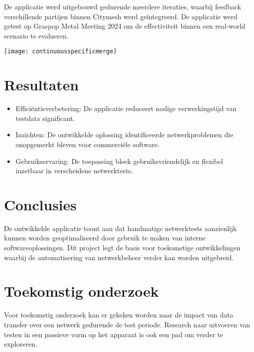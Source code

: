 \documentclass[a0,portrait]{hogent-poster}
\begin{document}
\begin{multicols}{2}
De applicatie werd uitgebouwd gedurende meerdere iteraties, waarbij feedback verschillende partijen binnen Citymesh werd geïntegreerd. De applicatie werd getest op Graspop Metal Meeting 2024 om de effectiviteit binnen een real-world scenario te evalueren.



\begin{center}
  \captionsetup{type=figure}
  \texttt{[image: continuousspecificmerge]}
\end{center}


\section{Resultaten}

\begin{itemize}
    \item Efficiëntieverbetering: De applicatie reduceert nodige verwerkingstijd van testdata significant.
    \item Inzichten: De ontwikkelde oplossing identificeerde netwerkproblemen die onopgemerkt bleven voor commerciële software.
    \item Gebruikservaring: De toepassing bleek gebruiksvriendelijk en flexibel inzetbaar in verscheidene netwerktests.
\end{itemize}

\section{Conclusies}

De ontwikkelde applicatie toont aan dat handmatige netwerktests aanzienlijk kunnen worden geoptimaliseerd door gebruik te maken van interne softwareoplossingen. Dit project legt de basis voor toekomstige ontwikkelingen waarbij de automatisering van netwerkbeheer verder kan worden uitgebreid.

\section{Toekomstig onderzoek}

Voor toekomstig onderzoek kan er gekeken worden naar de impact van data transfer over een netwerk gedurende de test periode. Research naar uitvoeren van testen in een passieve vorm op het apparaat is ook een pad om verder te exploreren.

\end{multicols}
\end{document}
